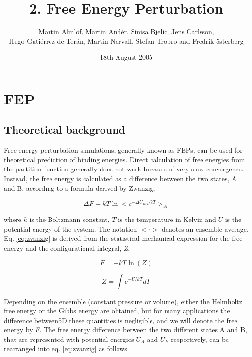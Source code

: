 \documentclass[a4paper,12pt]{article}
\author{Martin Alml\"of, Martin And\'er, Sinisa Bjelic, Jens Carlsson, \\
Hugo Guti\'errez de Ter\'an, Martin Nervall, Stefan Trobro and
Fredrik \"osterberg}
\date{18th August 2005}
\title{2. Free Energy Perturbation
}
\begin{document}
\maketitle
\tableofcontents

\newpage

\renewcommand{\thefigure}{\arabic{figure}}

\section{FEP}

\subsection{Theoretical background}
Free energy perturbation simulations, generally known as FEPs, can be
used for theoretical prediction of binding energies. Direct
calculation of free energies from the partition function generally does not
work because of very slow convergence. Instead, the free energy is calculated as a
difference between the two states, A and B, according to a formula derived by Zwanzig,

\begin{equation}
\label{eq:zvanzig}
  \Delta F=kT\ln <e^{-\Delta U_{BA}/kT}>_A
\end{equation}

\noindent where $k$ is the Boltzmann constant, $T$ is the
temperature in Kelvin and $U$ is the potential energy of the
system. The notation $<\cdot>$ denotes an ensemble average. Eq.
\ref{eq:zvanzig} is derived from the statistical mechanical
expression for the free energy and the configurational integral, \textit Z.

\begin{equation}
\label{eq:s.m.h.}
  F=-kT\ln(Z)
\end{equation}

\begin{equation}
\label{eq:conf}
  Z=\int e^{-U/kT} d \Gamma
\end{equation}

\noindent Depending on the ensemble (constant pressure or volume), either the Helmholtz free
energy or the Gibbs energy are obtained, but for many applications the difference between5D
these quantities is negligible, and we will denote the free energy
by \textit F. The free energy difference between the two different
states A and B, that are represented with potential energies $U_A$
and $U_B$ respectively, can be rearranged into eq.
\ref{eq:zvanzig} as follows
\end{document}
